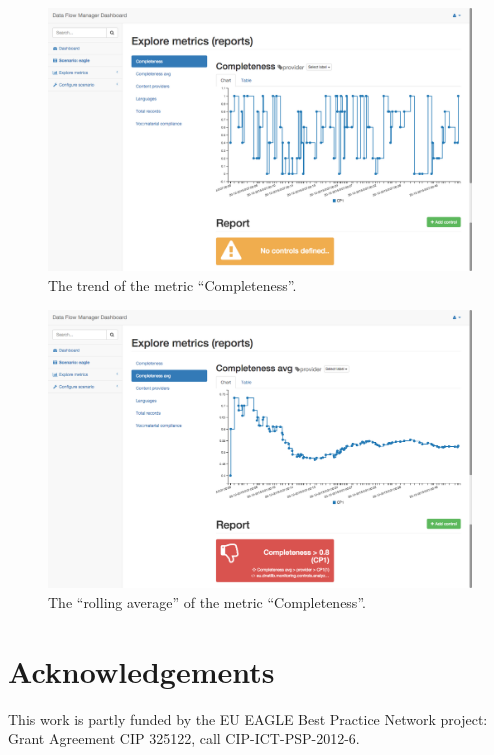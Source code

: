 \documentclass[amsthm,ebook]{saparticle}
\begin{document}
\begin{figure}[H]
\centering
\includegraphics[width=\textwidth]{img/comp.png}
\caption{The trend of the metric ``Completeness''.}
\label{fig:comp}
\end{figure}

\begin{figure}[H]
\centering
\includegraphics[width=\textwidth]{img/comp_ravg.png}
\caption{The ``rolling average'' of the metric ``Completeness''.}
\label{fig:ravg}
\end{figure}

\section*{Acknowledgements}
This work is partly funded by the EU EAGLE Best Practice Network project: Grant Agreement CIP 325122, call CIP-ICT-PSP-2012-6.




\end{document}
